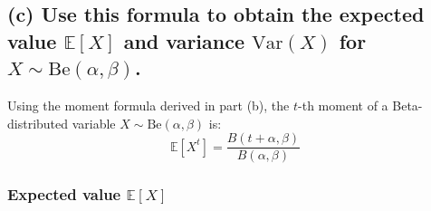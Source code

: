 








\newpage
\subsection*{(c) Use this formula to obtain the expected value $\mathbb{E}[X]$ and variance $\text{Var}(X)$ for $X \sim \text{Be}(\alpha, \beta)$.}

Using the moment formula derived in part (b), the \(t\)-th moment of a Beta-distributed variable \(X \sim \text{Be}(\alpha, \beta)\) is:
\begin{equation}
\mathbb{E}[X^t] = \frac{B(t + \alpha, \beta)}{B(\alpha, \beta)}    
\end{equation}

\subsubsection*{Expected value \(\mathbb{E}[X]\)}


